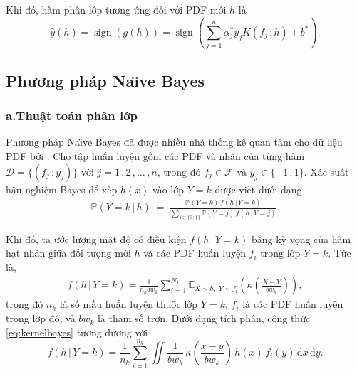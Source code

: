 \documentclass[a4paper,oneside]{book} %
\theoremstyle{plain}
\theoremstyle{plain}
\theoremstyle{nonumberplain}
\begin{document}

Khi đó, hàm phân lớp tương ứng đối với PDF mới $h$ là
	$$
	\hat{y}(h) = \operatorname{sign}\left( g(h) \right) = 
	\operatorname{sign}\left( \sum_{j=1}^n \alpha_j^* y_j K(f_j\,; h) + b^* \right).
	$$










\subsection{Phương pháp Na\"{\i}ve Bayes}


\subsubsection{a.\qquad Thuật toán phân lớp}

Phương pháp Na\"{\i}ve  Bayes  đã được nhiều nhà thống kê quan tâm cho dữ liệu PDF bởi \cite{ren2009naive}. 
Cho tập huấn luyện gồm các PDF và nhãn của từng hàm
$
\mathcal{D} = \{(f_j\,; y_j)\}$ với $j=1\,,2\,,\ldots\,,n$, trong đó $f_j \in \mathcal{F}$ và $y_j \in \{-1\,; 1\}$.
Xác suất hậu nghiệm Bayes để xếp $h(x)$ vào lớp $Y=k$ được viết dưới dạng
\begin{align*}
	\mathbb{P}(Y=k\,|\,h) \;=\; 
	\frac{\mathbb{P}(Y=k)\, f(h\,|\,Y=k)}
	{\sum_{j\in\{0\,;1\}} \mathbb{P}(Y=j)\, f(h \,|\,Y=j)}.
\end{align*}

Khi đó, ta ước lượng mật độ có điều kiện $f(h \,|\, Y=k)$ bằng kỳ vọng của hàm hạt nhân giữa đối tượng mới $h$ và các PDF huấn luyện $f_i$ trong lớp $Y=k$. Tức là,
\begin{align}
	f(h \,|\, Y=k) 
	= \frac{1}{n_k bw_k} \sum_{i=1}^{N_k} 
	\mathbb{E}_{X \sim h,\; Y \sim f_{i}}
	\left(
	\kappa\left(\frac{X-Y}{bw_k}\right)
	\right), \label{eq:kernelbayes}
\end{align}
trong đó $n_k$ là số mẫu huấn luyện thuộc lớp $Y=k$, 
$f_i$ là các PDF huấn luyện trong lớp đó, 
và $bw_k$ là tham số trơn.
Dưới dạng tích phân, công thức \eqref{eq:kernelbayes} tương đương với
$$
	f(h \,|\, Y=k) 
	= \frac{1}{n_k}\sum_{i=1}^{n_k} 
	\iint \frac{1}{bw_k}\, \kappa\left(\frac{x-y}{bw_k}\right)\, h(x)\, f_{i}(y)\, \mathrm{d}x\, \mathrm{d}y.
$$
\end{document}
